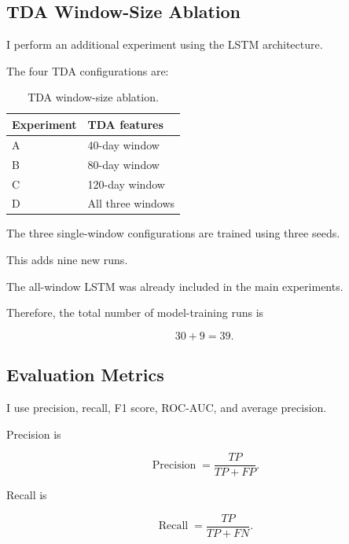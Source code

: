 \documentclass[oneside,english,11pt]{article}
\renewcommand{\boxed}[1]{#1}
\begin{document}
\subsection{TDA Window-Size Ablation}

I perform an additional experiment
using the LSTM architecture.

The four TDA configurations are:

\begin{table}[htbp]
\centering

\caption{TDA window-size ablation.}
\label{tab:ablation_settings}

\begin{tabular}{ll}
\toprule
Experiment & TDA features\\
\midrule
A & 40-day window\\
B & 80-day window\\
C & 120-day window\\
D & All three windows\\
\bottomrule
\end{tabular}

\end{table}

The three single-window configurations
are trained using three seeds.

This adds nine new runs.

The all-window LSTM was already included
in the main experiments.

Therefore, the total number of
model-training runs is

\begin{equation}
\boxed{
30+9=39.
}
\end{equation}

\subsection{Evaluation Metrics}


I use precision, recall, F1 score,
ROC-AUC, and average precision.

Precision is

\begin{equation}
\boxed{
\operatorname{Precision}
=
\frac{TP}{TP+FP}.
}
\end{equation}

Recall is

\begin{equation}
\boxed{
\operatorname{Recall}
=
\frac{TP}{TP+FN}.
}
\end{equation}
\end{document}

